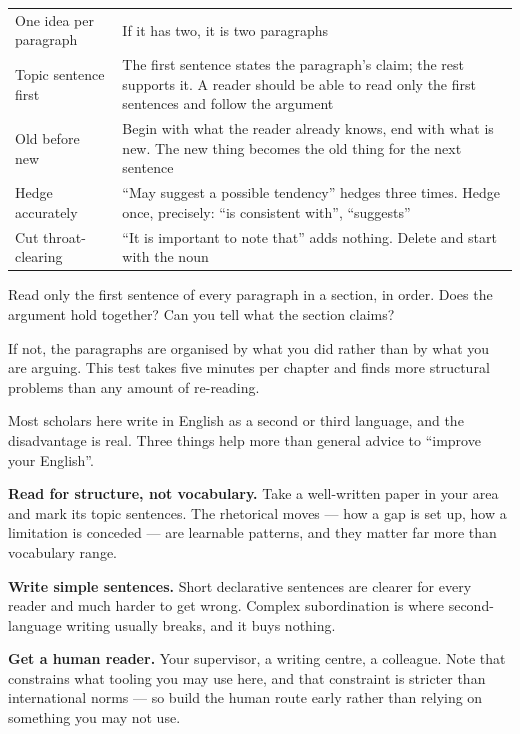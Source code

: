 \begin{center}
\small
\begin{tabular}{@{}L{3.4cm}L{10.9cm}@{}}
\toprule
One idea per paragraph & If it has two, it is two paragraphs \\
Topic sentence first   & The first sentence states the paragraph's claim; the
                         rest supports it. A reader should be able to read only
                         the first sentences and follow the argument \\
Old before new         & Begin with what the reader already knows, end with
                         what is new. The new thing becomes the old thing for
                         the next sentence \\
Hedge accurately       & ``May suggest a possible tendency'' hedges three
                         times. Hedge once, precisely: ``is consistent with'',
                         ``suggests'' \\
Cut throat-clearing    & ``It is important to note that'' adds nothing. Delete
                         and start with the noun \\
\bottomrule
\end{tabular}
\end{center}

\begin{conceptbox}
Read only the first sentence of every paragraph in a section, in order. Does
the argument hold together? Can you tell what the section claims?

\medskip
If not, the paragraphs are organised by what you did rather than by what you
are arguing. This test takes five minutes per chapter and finds more structural
problems than any amount of re-reading.
\end{conceptbox}

\begin{alertbox}
Most scholars here write in English as a second or third language, and the
disadvantage is real. Three things help more than general advice to ``improve
your English''.

\medskip
\textbf{Read for structure, not vocabulary.} Take a well-written paper in your
area and mark its topic sentences. The rhetorical moves --- how a gap is set
up, how a limitation is conceded --- are learnable patterns, and they matter far
more than vocabulary range.

\medskip
\textbf{Write simple sentences.} Short declarative sentences are clearer for
every reader and much harder to get wrong. Complex subordination is where
second-language writing usually breaks, and it buys nothing.

\medskip
\textbf{Get a human reader.} Your supervisor, a writing centre, a colleague.
Note that  constrains what tooling you may use here, and that
constraint is stricter than international norms --- so build the human route
early rather than relying on something you may not use.
\end{alertbox}

